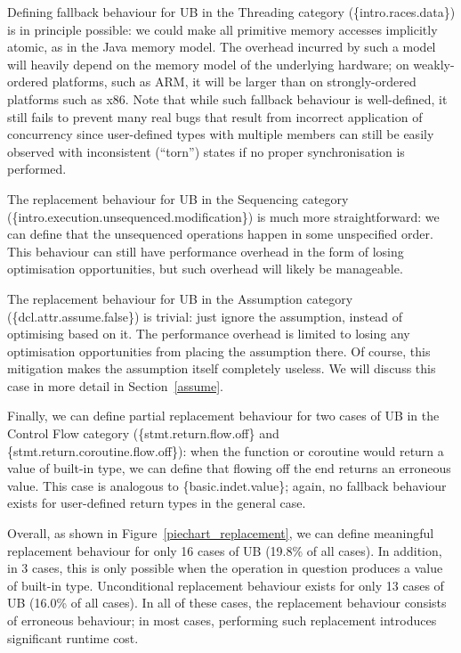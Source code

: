 Defining fallback behaviour for UB in the Threading category (\{intro.races.data\}) is in principle possible: we could make all primitive memory accesses implicitly atomic, as in the Java memory model. The overhead incurred by such a model will heavily depend on the memory model of the underlying hardware; on weakly-ordered platforms, such as ARM,
it will be larger than on strongly-ordered platforms such as x86. Note that while such fallback behaviour is well-defined, it still fails to prevent many real bugs that result from incorrect application of concurrency since user-defined types with multiple members can still be easily observed with inconsistent (``torn'') states if no proper synchronisation is performed.

The replacement behaviour for UB in the Sequencing category (\{intro.execution.unsequenced.modifica\-tion\}) is much more straightforward: we can define that the unsequenced operations happen in some unspecified order. This behaviour can still have performance overhead in the form of losing  optimisation opportunities, but such overhead will likely be manageable. 

The replacement behaviour for UB in the Assumption category (\{dcl.attr.assume.false\}) is trivial: just ignore the assumption, instead of optimising based on it. The performance overhead is limited to losing any optimisation opportunities from placing the assumption there. Of course, this mitigation makes the assumption itself completely useless. We will discuss this case in more detail in Section~\ref{assume}.

Finally, we can define partial replacement behaviour for two cases of UB in the Control Flow category  (\{stmt.return.flow.off\} and \{stmt.return.coroutine.flow.off\}): when the function or coroutine would return a value of built-in type, we can define that flowing off the end returns an erroneous value. This case is analogous to \{basic.indet.value\}; again, no fallback behaviour exists for user-defined return types in the general case.

Overall, as shown in Figure~\ref{piechart_replacement}, we can define meaningful replacement behaviour for only 16 cases of UB (19.8\% of all cases). In addition, in 3 cases, this is only possible when the operation in question produces a value of built-in type. Unconditional replacement behaviour exists for only 13 cases of UB (16.0\% of all cases). In all of these cases, the replacement behaviour consists of erroneous behaviour; in most cases, performing such replacement introduces significant runtime cost.

